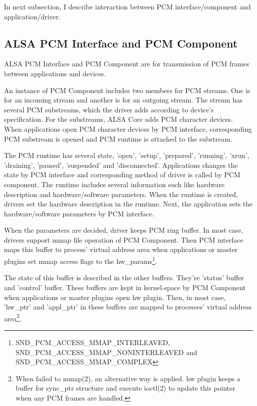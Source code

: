 \documentclass[onecolumn]{article}
\begin{document}
In next subsection, I describe interaction between PCM interface/component and application/driver.

\subsection{ALSA PCM Interface and PCM Component}
\label{sec:alsa-pcm}

ALSA PCM Interface and PCM Component are for transmission of PCM frames between applications and devices.

An instance of PCM Component includes two members for PCM streams. One is for an incoming stream and another is for an outgoing stream. The stream has several PCM substreams, which the driver adds according to device's specification. For the substreams, ALSA Core adds PCM character devices. When applications open PCM character devices by PCM interface, corresponding PCM substream is opened and PCM runtime is attached to the substream.

The PCM runtime has several state, 'open', 'setup', 'prepared', 'running', 'xrun', 'draining', 'paused', 'suspended' and 'disconnected'\cite{alsa-lib}. Applications changes the state by PCM interface and corresponding method of driver is called by PCM component. The runtime includes several information such like hardware description and hardware/software parameters. When the runtime is created, drivers set the hardware description in the runtime. Next, the application sets the hardware/software parameters by PCM interface.

When the parameters are decided, driver keeps PCM ring buffer. In most case, drivers support mmap file operation of PCM Component. Then PCM interface maps this buffer to process' virtual address area when applications or master plugins set mmap access flags to the hw\_params\footnote{SND\_PCM\_ACCESS\_MMAP\_INTERLEAVED, SND\_PCM\_ACCESS\_MMAP\_NONINTERLEAVED and SND\_PCM\_ACCESS\_MMAP\_COMPLEX}.

The state of this buffer is described in the other buffers. They're 'status' buffer and 'control' buffer. These buffers are kept in kernel-space by PCM Component when applications or master plugins open hw plugin. Then, in most case, 'hw\_ptr' and 'appl\_ptr' in these buffers are mapped to processes' virtual address area\footnote{When failed to mmap(2), an alternative way is applied. hw plugin keeps a buffer for sync\_ptr structure and execute ioctl(2) to update this pointer when any PCM frames are handled.}.
\end{document}
